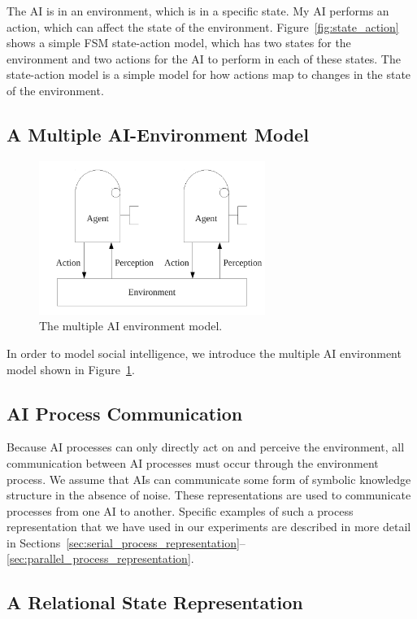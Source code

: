 The AI is in an environment, which is in a specific state.  My
AI performs an action, which can affect the state of the
environment.  Figure~\ref{fig:state_action} shows a simple \ac{FSM}
state-action model, which has two states for the environment and two
actions for the AI to perform in each of these states.  The
state-action model is a simple model for how actions map to changes in
the state of the environment.


\subsection{A Multiple AI-Environment Model}

\begin{figure}[bth]
  \center
  \includegraphics[height=5cm]{gfx/multiple_agent_environment}
  \caption[The multiple AI environment model]{The multiple AI environment model.}
  \label{fig:multiple_agent_environment}
\end{figure}

In order to model social intelligence, we introduce the multiple AI
environment model shown in
Figure~\ref{fig:multiple_agent_environment}.


\subsection{AI Process Communication}

Because AI processes can only directly act on and perceive the
environment, all communication between AI processes must occur
through the environment process.  We assume that AIs can
communicate some form of symbolic knowledge structure in the absence
of noise.  These representations are used to communicate processes
from one AI to another.  Specific examples of such a process
representation that we have used in our experiments are described in
more detail in
Sections~\ref{sec:serial_process_representation}--\ref{sec:parallel_process_representation}.


\subsection{A Relational State Representation}

